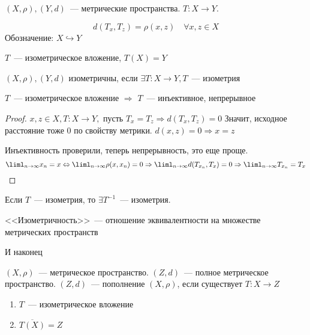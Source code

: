 \documentclass[document]{subfiles}
\begin{document}
$(X, \rho), (Y, d)$~--- метрические пространства. $T: X \rightarrow Y$.
\begin{definition}
    \[ d(T_x, T_z) = \rho(x,z) \quad \forall x,z \in X \]
Обозначение: $ X \hookrightarrow Y$
\end{definition}

\begin{definition}[Изометрия]
    $T$~--- изометрическое вложение, $T(X) = Y$
    
\end{definition}
\begin{definition}
    $(X, \rho), (Y,d)$ изометричны, если $\exists T: X \rightarrow Y, T$~--- изометрия
\end{definition}

\begin{property}
    $T$~--- изометрическое вложение $\Rightarrow$ $T$~--- инъективное, непрерывное
\end{property}
\begin{proof} 
    $x, z \in X, T: X \rightarrow Y,$ пусть $T_x = T_z \Rightarrow d(T_x, T_z) = 0$ 
    Значит, исходное расстояние тоже 0 по свойству метрики. $d(x,z) = 0 \Rightarrow x = z$

    Инъективность проверили, теперь непрерывность, это еще проще.
    \[ \liml_{n \to \infty} x_n = x \Leftrightarrow \liml_{n \to \infty} \rho(x, x_n) = 0 \Rightarrow \liml_{n \to \infty} d(T_{x_n}, T_x) = 0 \Rightarrow \liml_{n \to \infty} T_{x_n} = T_x \]

\end{proof}

\begin{property}
    Если $T$~--- изометрия, то $\exists T^{-1}$~--- изометрия.
\end{property}

\begin{property}
    <<Изометричность>>~--- отношение эквивалентности на множестве метрических пространств
\end{property}

И наконец

\begin{definition}
    $(X, \rho)$~--- метрическое пространство. $(Z, d)$~--- полное метрическое пространство.
    $(Z,d)$~--- пополнение $(X, \rho)$, если существует $T: X \rightarrow Z$
    \begin{enumerate}
        \item $T$~--- изометрическое вложение
        \item $\overline{T(X)} = Z$
    \end{enumerate}
\end{definition}
\end{document}
